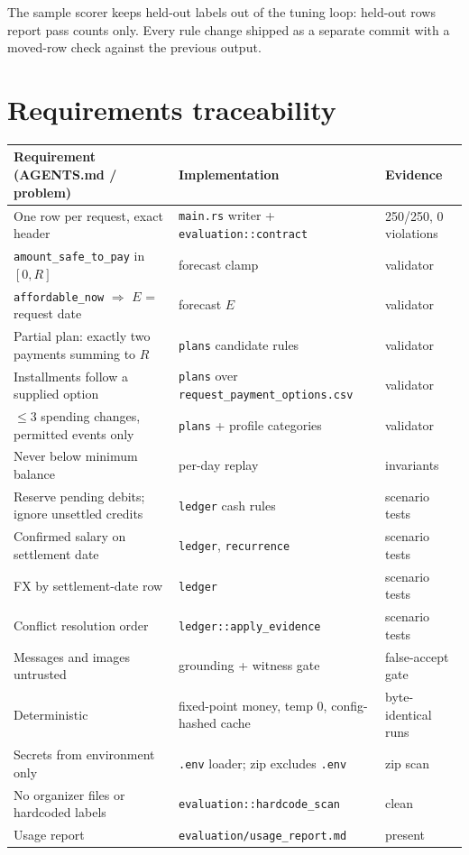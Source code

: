 \documentclass[11pt,a4paper]{article}
\begin{document}
\noindent The sample scorer keeps held-out labels out of the tuning loop: held-out rows report pass counts only. Every rule
change shipped as a separate commit with a moved-row check against the previous output.

\section{Requirements traceability}
\begin{longtable}{p{5.2cm} p{6.4cm} p{3.4cm}}
\toprule
\textbf{Requirement (AGENTS.md / problem)} & \textbf{Implementation} & \textbf{Evidence}\\\midrule
\endhead
One row per request, exact header & \texttt{main.rs} writer + \texttt{evaluation::contract} & 250/250, 0 violations\\
\texttt{amount\_safe\_to\_pay} in $[0,R]$ & forecast clamp & validator\\
\texttt{affordable\_now} $\Rightarrow$ $E$ = request date & forecast $E$ & validator\\
Partial plan: exactly two payments summing to $R$ & \texttt{plans} candidate rules & validator\\
Installments follow a supplied option & \texttt{plans} over \texttt{request\_payment\_options.csv} & validator\\
$\le$3 spending changes, permitted events only & \texttt{plans} + profile categories & validator\\
Never below minimum balance & per-day replay & invariants\\
Reserve pending debits; ignore unsettled credits & \texttt{ledger} cash rules & scenario tests\\
Confirmed salary on settlement date & \texttt{ledger}, \texttt{recurrence} & scenario tests\\
FX by settlement-date row & \texttt{ledger} & scenario tests\\
Conflict resolution order & \texttt{ledger::apply\_evidence} & scenario tests\\
Messages and images untrusted & grounding + witness gate & false-accept gate\\
Deterministic & fixed-point money, temp 0, config-hashed cache & byte-identical runs\\
Secrets from environment only & \texttt{.env} loader; zip excludes \texttt{.env} & zip scan\\
No organizer files or hardcoded labels & \texttt{evaluation::hardcode\_scan} & clean\\
Usage report & \texttt{evaluation/usage\_report.md} & present\\
\bottomrule
\end{longtable}
\end{document}
